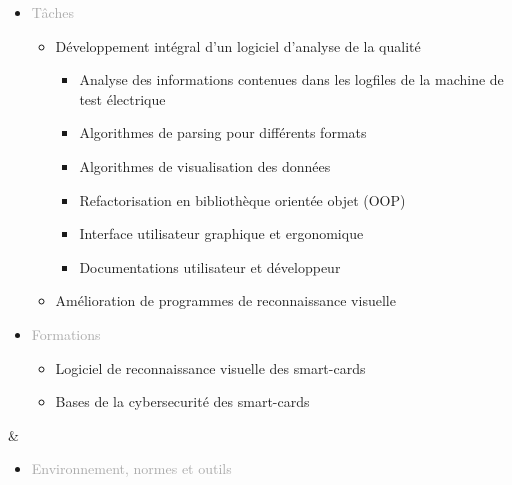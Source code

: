 \documentclass{article}
\begin{document}
\begin{tabular}
\begin{itemize}
        \item \textcolor{darkGray}{Tâches} 
        \begin{itemize}
        [label={\textcolor{gray!100}{\checkmark}}, topsep=8pt, partopsep=0pt, itemsep=0.5pt, parsep=2pt] 
            \item \textcolor{gray!100}{Développement intégral d'un logiciel d'analyse de la qualité}
            \begin{itemize}
                [label={\textcolor{gray!100}{$\triangleright$}}, topsep=0pt, partopsep=0pt, itemsep=0.5pt, parsep=2pt]
                \item \textcolor{gray!100}{Analyse des informations contenues dans les logfiles de la machine de test électrique}
                \item \textcolor{gray!100}{Algorithmes de parsing pour différents formats}
                \item \textcolor{gray!100}{Algorithmes de visualisation des données}
                \item \textcolor{gray!100}{Refactorisation en bibliothèque orientée objet (OOP)}
                \item \textcolor{gray!100}{Interface utilisateur graphique et ergonomique}
                \item \textcolor{gray!100}{Documentations utilisateur et développeur}
            \end{itemize}
            \item \textcolor{gray!100}{Amélioration de programmes de reconnaissance visuelle}
        \end{itemize}
        \item \textcolor{darkGray}{Formations} 
        \begin{itemize}
            [label={\textcolor{gray!100}{\checkmark}}, topsep=8pt, partopsep=0pt, itemsep=0.5pt, parsep=2pt] 
                \item \textcolor{gray!100}{Logiciel de reconnaissance visuelle des smart-cards}
                \item \textcolor{gray!100}{Bases de la cybersecurité des smart-cards}
        \end{itemize}
    \end{itemize}
    &
    \begin{itemize}[label={}, topsep=8pt, partopsep=0pt, itemsep=0.5pt, parsep=2pt,after=\vspace*{-\baselineskip}]
        \setlength{\itemsep}{10pt} 
        \item \textcolor{darkGray}{Environnement, normes et outils} 

\end{itemize}
\end{tabular}
\end{document}
